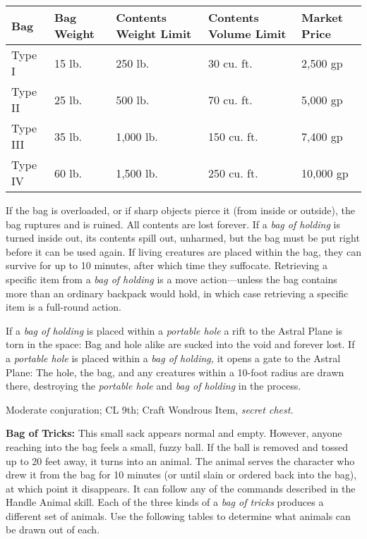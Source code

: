 \documentclass{article}
\begin{document}
\begin{tabular}{|>{\raggedright}p{37pt}|>{\raggedright}p{29pt}|>{\raggedright}p{42pt}|>{\raggedright}p{42pt}|>{\raggedright}p{51pt}|}
\hline
B\textbf{ag} & B\textbf{ag Weight} & C\textbf{ontents Weight Limit} & C\textbf{ontents 
Volume Limit} & M\textbf{arket Price}\tabularnewline
\hline
Type I & 15 lb. & 250 lb. & 30 cu. ft. & 2,500 gp\tabularnewline
\hline
Type II & 25 lb. & 500 lb. & 70 cu. ft. & 5,000 gp\tabularnewline
\hline
Type III & 35 lb. & 1,000 lb. & 150 cu. ft. & 7,400 gp\tabularnewline
\hline
Type IV & 60 lb. & 1,500 lb. & 250 cu. ft. & 10,000 gp\tabularnewline
\hline
\end{tabular}

If the bag is overloaded, or if sharp objects pierce it (from inside or outside), 
the bag ruptures and is ruined. All contents are lost forever. If a \textit{bag 
of holding }is turned inside out, its contents spill out, unharmed, but the bag 
must be put right before it can be used again. If living creatures are placed within 
the bag, they can survive for up to 10 minutes, after which time they suffocate. 
Retrieving a specific item from a \textit{bag of holding }is a move action---unless 
the bag contains more than an ordinary backpack would hold, in which case retrieving 
a specific item is a full-round action.

If a \textit{bag of holding }is placed within a \textit{portable hole} a rift to 
the Astral Plane is torn in the space: Bag and hole alike are sucked into the void 
and forever lost. If a \textit{portable hole }is placed within a \textit{bag of 
holding, }it opens a gate to the Astral Plane: The hole, the bag, and any creatures 
within a 10-foot radius are drawn there, destroying the \textit{portable hole }and 
\textit{bag of holding }in the process.

Moderate conjuration; CL 9th; Craft Wondrous Item, \textit{secret chest.}

\textbf{Bag of Tricks: }This small sack appears normal and empty. However, anyone 
reaching into the bag feels a small, fuzzy ball. If the ball is removed and tossed 
up to 20 feet away, it turns into an animal. The animal serves the character who 
drew it from the bag for 10 minutes (or until slain or ordered back into the bag), 
at which point it disappears. It can follow any of the commands described in the 
Handle Animal skill. Each of the three kinds of a \textit{bag of tricks }produces 
a different set of animals. Use the following tables to determine what animals 
can be drawn out of each.
\end{document}
